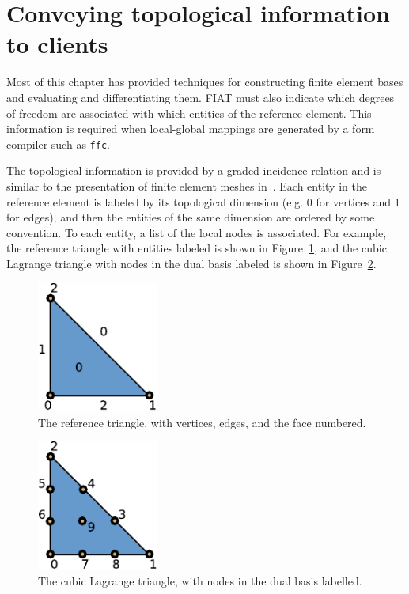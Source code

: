 \section{Conveying topological information to clients}
Most of this chapter has provided techniques for constructing finite
element bases and evaluating and differentiating them.
FIAT must also indicate which degrees of freedom are
associated with which entities of the reference element.  This
information is required when local-global mappings are generated by a
form compiler such as \texttt{ffc}.

The topological information is provided by a graded incidence relation
and is similar to the presentation of finite element meshes in~\cite{Log09}.
Each entity in the reference element is
labeled by its topological dimension (e.g. 0 for vertices and 1 for
edges), and then the entities of the same dimension are ordered by
some convention.  To each entity, a list of the local nodes is
associated.  For example, the reference triangle with entities labeled
is shown in Figure~\ref{fig:reftri}, and the
cubic Lagrange triangle with nodes in the dual basis labeled is
shown in Figure~\ref{fig:p3}.

\begin{figure}[h]
  \label{fig:reftri}
  \begin{center}
    \includegraphics[width=4cm]{chapters/kirby-2/pdf/reftri.pdf}
    \caption{The reference triangle, with vertices, edges, and the
      face numbered.}
  \end{center}
\end{figure}

\begin{figure}[h]
  \label{fig:p3}
  \begin{center}
    \includegraphics[width=4cm]{chapters/kirby-2/pdf/P3.pdf}
    \caption{The cubic Lagrange triangle, with nodes in the dual basis
      labelled.}
  \end{center}
\end{figure}

